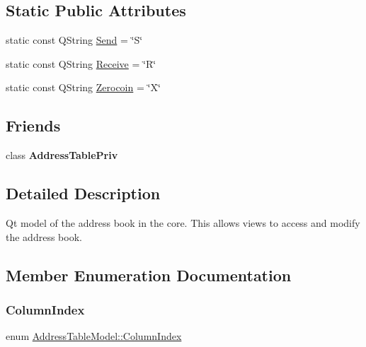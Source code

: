 \subsection*{Static Public Attributes}
\begin{DoxyCompactItemize}
\item 
static const Q\+String \mbox{\hyperlink{class_address_table_model_a7c74e158d014a757c2edcc5bcb1e9a62}{Send}} = \char`\"{}S\char`\"{}
\item 
static const Q\+String \mbox{\hyperlink{class_address_table_model_acaed83193545456eab47dd7be1d2ceba}{Receive}} = \char`\"{}R\char`\"{}
\item 
static const Q\+String \mbox{\hyperlink{class_address_table_model_a8792d7ee2440aa349488ed6a369e50b6}{Zerocoin}} = \char`\"{}X\char`\"{}
\end{DoxyCompactItemize}
\subsection*{Friends}
\begin{DoxyCompactItemize}
\item 
\mbox{\label{class_address_table_model_aa3f1055879193511b3a0088db8c1d9ec}} 
class {\bfseries Address\+Table\+Priv}
\end{DoxyCompactItemize}


\subsection{Detailed Description}
Qt model of the address book in the core. This allows views to access and modify the address book. 

\subsection{Member Enumeration Documentation}
\mbox{\label{class_address_table_model_a432276ac4504e926466072561c5ddb33}} 
\subsubsection{\texorpdfstring{ColumnIndex}{ColumnIndex}}
{\footnotesize\ttfamily enum \mbox{\hyperlink{class_address_table_model_a432276ac4504e926466072561c5ddb33}{Address\+Table\+Model\+::\+Column\+Index}}}

